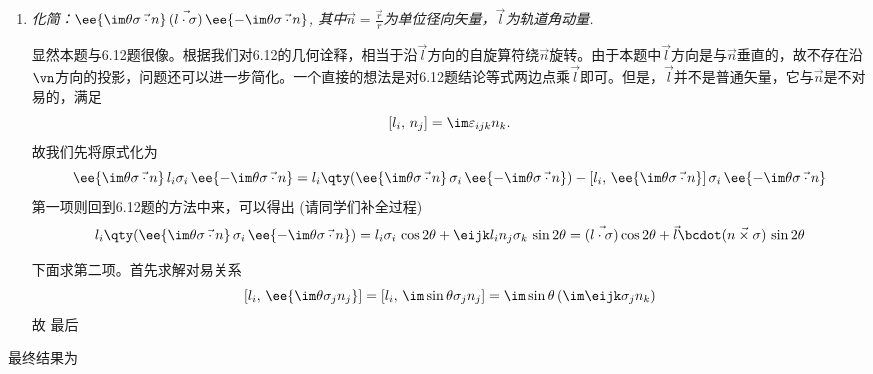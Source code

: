 \begin{enumerate}[label=\textbf{6.\Alph*}, listparindent=\parindent]
\begin{enumerate}[listparindent=\parindent]
\item \emph{化简：$\ee{\im\theta\vec{\sigma\cdot n}}\,(\vec{l\cdot \sigma})\,\ee{-\im\theta\vec{\sigma\cdot n}}$, 其中$\vec{n}=\frac{\vec{r}}{r}$为单位径向矢量，$\vec{l}$为轨道角动量.}

显然本题与6.12题很像。根据我们对6.12的几何诠释，相当于沿$\vec{l}$方向的自旋算符绕$\vec{n}$旋转。由于本题中$\vec{l}$方向是与$\vec{n}$垂直的，故不存在沿$\vn$方向的投影，问题还可以进一步简化。一个直接的想法是对6.12题结论等式两边点乘$\vec{l}$即可。但是，$\vec{l}$并不是普通矢量，它与$\vec{n}$是不对易的，满足
\[[l_i,\,n_j]=\im\varepsilon_{ijk}n_k.\]
故我们先将原式化为
\[\ee{\im\theta\vec{\sigma\cdot n}}\,l_i\sigma_i\,\ee{-\im\theta\vec{\sigma\cdot n}} = l_i\qty(\ee{\im\theta\vec{\sigma\cdot n}}\,\sigma_i\,\ee{-\im\theta\vec{\sigma\cdot n}})-[l_i,\,\ee{\im\theta\vec{\sigma\cdot n}}]\,\sigma_i\,\ee{-\im\theta\vec{\sigma\cdot n}}\]
第一项则回到6.12题的方法中来，可以得出 (请同学们补全过程)
\[l_i\qty(\ee{\im\theta\vec{\sigma\cdot n}}\,\sigma_i\,\ee{-\im\theta\vec{\sigma\cdot n}}) = l_i\sigma_i\,\cos2\theta +\eijk l_in_j\sigma_k\,\sin2\theta=(\vec{l\cdot \sigma})\cos2\theta+\vec{l}\bcdot(\vec{n\times\sigma})\,\sin2\theta\]

下面求第二项。首先求解对易关系
\[[l_i,\,\ee{\im\theta\sigma_jn_j}]=[l_i,\,\im\sin\theta\sigma_jn_j]=\im\sin\theta\,(\im\eijk \sigma_j n_k)\]
故
最后
\end{enumerate}
最终结果为



\end{enumerate}
